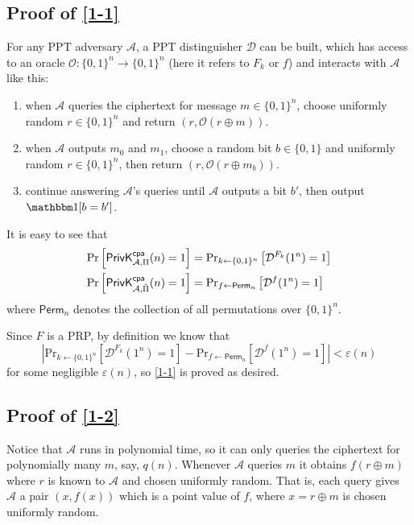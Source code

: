 \documentclass[8pt]{article}
\theoremstyle{compact}
\begin{document}
\subsection*{Proof of \cref{1-1}}

For any PPT adversary $\mathcal A$, a PPT distinguisher $\mathcal D$ can be built, which has access to an oracle $\mathcal O: \{0, 1\}^n \to \{0, 1\}^n$ (here it refers to $F_k$ or $f$) and interacts with $\mathcal A$ like this:
\begin{enumerate}
	\item when $\mathcal A$ queries the ciphertext for message $m \in \{0, 1\}^n$, choose uniformly random $r \in \{0, 1\}^n$ and return $(r, \mathcal O(r \oplus m))$.
	\item when $\mathcal A$ outputs $m_0$ and $m_1$, choose a random bit $b \in \{0, 1\}$ and uniformly random $r \in \{0, 1\}^n$, then return $(r, \mathcal O(r \oplus m_b))$.
	\item continue answering $\mathcal A$'s queries until $\mathcal A$ outputs a bit $b'$, then output $\mathbbm 1[b = b']$.
\end{enumerate}

It is easy to see that \begin{align*}
	\begin{split}
		\text{Pr}\left[\textsf{PrivK}_{{\mathcal A, \Pi}}^{\textsf{cpa}}(n) = 1\right] &= \text{Pr}_{k \gets \{0, 1\}^n}\left[\mathcal D^{F_k}(1^n) = 1\right] \\
		\text{Pr}\left[\textsf{PrivK}_{{\mathcal A, \tilde{\Pi}}}^{\textsf{cpa}}(n) = 1\right] &= \text{Pr}_{f \gets \textsf{Perm}_n}\left[\mathcal D^{f}(1^n) = 1\right]
	\end{split}
\end{align*}
where $\textsf{Perm}_n$ denotes the collection of all permutations over $\{0, 1\}^n$.

Since $F$ is a PRP, by definition we know that $$\left| \text{Pr}_{k \gets \{0, 1\}^n}\left[\mathcal D^{F_k}(1^n) = 1\right] - \text{Pr}_{f \gets \textsf{Perm}_n}\left[\mathcal D^{f}(1^n) = 1\right] \right| < \varepsilon(n)$$ for some negligible $\varepsilon(n)$, so \cref{1-1} is proved as desired.

\subsection*{Proof of \cref{1-2}}
Notice that $\mathcal A$ runs in polynomial time, so it can only queries the ciphertext for polynomially many $m$, say, $q(n)$. Whenever $\mathcal A$ queries $m$ it obtains $f(r \oplus m)$ where $r$ is known to $\mathcal A$ and chosen uniformly random. That is, each query gives $\mathcal A$ a pair $(x, f(x))$ which is a point value of $f$, where $x = r \oplus m$ is chosen uniformly random.
\end{document}
